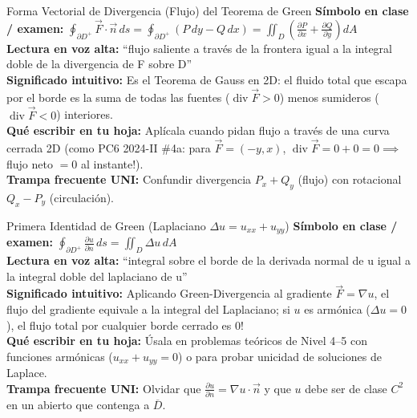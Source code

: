 \documentclass[11pt,a4paper]{article}
\begin{document}
\begin{definicionbox}{Forma Vectorial de Divergencia (Flujo) del Teorema de Green}
\textbf{Símbolo en clase / examen:} $\oint_{\partial D^+} \vec{F}\cdot\vec{n}\,ds = \oint_{\partial D^+} (P\,dy - Q\,dx) = \iint_D \left(\frac{\partial P}{\partial x} + \frac{\partial Q}{\partial y}\right) dA$\\[0.15cm]
\textbf{Lectura en voz alta:} ``flujo saliente a través de la frontera igual a la integral doble de la divergencia de F sobre D''\\[0.12cm]
\textbf{Significado intuitivo:} Es el Teorema de Gauss en 2D: el fluido total que escapa por el borde es la suma de todas las fuentes ($\operatorname{div}\vec{F} > 0$) menos sumideros ($\operatorname{div}\vec{F} < 0$) interiores.\\[0.12cm]
\textbf{Qué escribir en tu hoja:} Aplícala cuando pidan flujo a través de una curva cerrada 2D (como PC6 2024-II \#4a: para $\vec{F}=(-y,x)$, $\operatorname{div}\vec{F} = 0 + 0 = 0 \implies$ flujo neto $= 0$ al instante!).\\[0.12cm]
\textbf{Trampa frecuente UNI:} Confundir divergencia $P_x + Q_y$ (flujo) con rotacional $Q_x - P_y$ (circulación).
\end{definicionbox}

\begin{definicionbox}{Primera Identidad de Green (Laplaciano $\Delta u = u_{xx} + u_{yy}$)}
\textbf{Símbolo en clase / examen:} $\oint_{\partial D^+} \frac{\partial u}{\partial n}\,ds = \iint_D \Delta u\,dA$\\[0.15cm]
\textbf{Lectura en voz alta:} ``integral sobre el borde de la derivada normal de u igual a la integral doble del laplaciano de u''\\[0.12cm]
\textbf{Significado intuitivo:} Aplicando Green-Divergencia al gradiente $\vec{F} = \nabla u$, el flujo del gradiente equivale a la integral del Laplaciano; si $u$ es armónica ($\Delta u = 0$), el flujo total por cualquier borde cerrado es $0$!\\[0.12cm]
\textbf{Qué escribir en tu hoja:} Úsala en problemas teóricos de Nivel 4--5 con funciones armónicas ($u_{xx} + u_{yy} = 0$) o para probar unicidad de soluciones de Laplace.\\[0.12cm]
\textbf{Trampa frecuente UNI:} Olvidar que $\frac{\partial u}{\partial n} = \nabla u \cdot \vec{n}$ y que $u$ debe ser de clase $C^2$ en un abierto que contenga a $\overline{D}$.
\end{definicionbox}
\end{document}
